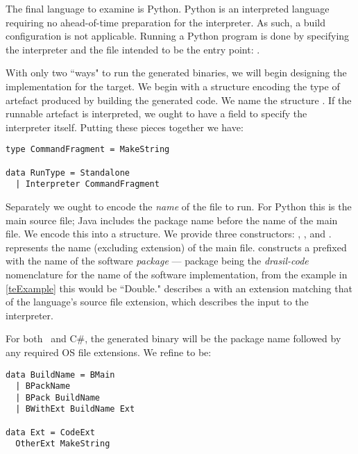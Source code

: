 {{{{{The final language to examine is Python. Python is an interpreted language requiring no ahead-of-time preparation for the interpreter. As such, a build configuration is not applicable. Running a Python program is done by specifying the interpreter and the file intended to be the entry point: .

With only two ``ways" to run the generated binaries, we will begin designing the implementation for the  target. We begin with a structure encoding the type of artefact produced by building the generated code. We name the structure . If the runnable artefact is interpreted, we ought to have a field to specify the interpreter itself. Putting these pieces together we have:

\begin{tcolorbox}
\begin{verbatim}
type CommandFragment = MakeString

data RunType = Standalone
  | Interpreter CommandFragment
\end{verbatim}
\end{tcolorbox}

Separately we ought to encode the \textit{name} of the file to run. For Python this is the main source file; Java includes the package name before the name of the main file. We encode this into a  structure. We provide three constructors: , , and .  represents the name (excluding extension) of the main file.  constructs a  prefixed with the name of the software \textit{package} --- package being the \textit{drasil-code} nomenclature for the name of the software implementation, from the example in \autoref{teExample} this would be ``Double."  describes a  with an extension matching that of the language's source file extension, which describes the input to the  interpreter.

For both \CC~and C\#, the generated binary will be the package name followed by any required OS file extensions. We refine  to be:

\begin{tcolorbox}
\begin{verbatim}
data BuildName = BMain
  | BPackName
  | BPack BuildName
  | BWithExt BuildName Ext

data Ext = CodeExt
  OtherExt MakeString
\end{verbatim}
\end{tcolorbox}

}}}}}
